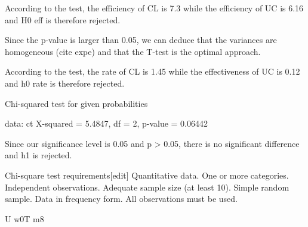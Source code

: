 \documentclass[10pt,twocolumn]{article}
\begin{document}
According to the test, the efficiency of CL is 7.3 while the efficiency of UC is 6.16 and H0 eff is therefore rejected. 






Since the p-value is larger than 0.05, we can deduce that the variances are homogeneous (cite expe) and that the T-test is the optimal approach.




According to the test, the rate of CL is 1.45 while the effectiveness of UC is 0.12 and h0 rate is therefore rejected. 


	Chi-squared test for given probabilities

data:  ct
X-squared = 5.4847, df = 2, p-value = 0.06442

Since our significance level is 0.05 and p > 0.05, there is no significant difference and h1 is rejected. 


Chi-square test requirements[edit]
Quantitative data.
One or more categories.
Independent observations.
Adequate sample size (at least 10).
Simple random sample.
Data in frequency form.
All observations must be used.




U w0T m8
\end{document}
